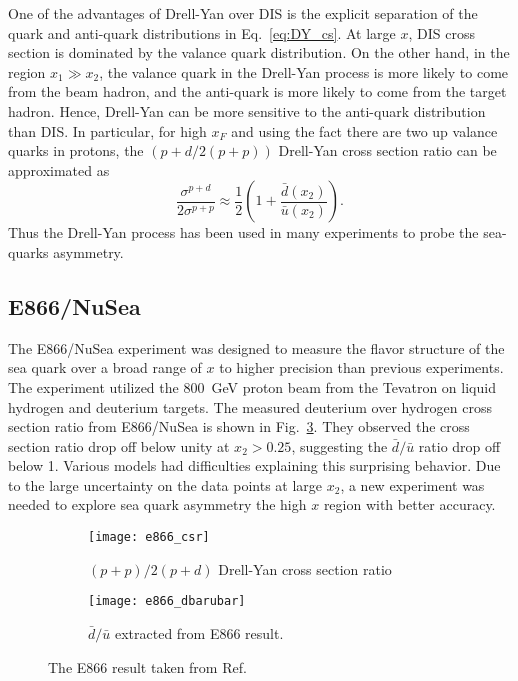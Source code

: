 One of the advantages of Drell-Yan over DIS is the explicit separation of the quark
and anti-quark distributions in Eq.\ \ref{eq:DY_cs}. At large $x$, DIS cross section 
is dominated by the valance quark distribution. On the other hand, in the region $x_1 \gg x_2$,
the valance quark in the Drell-Yan process is more likely to come from the beam 
hadron, and the anti-quark is more likely to come from the target hadron. Hence,
Drell-Yan can be more sensitive to the anti-quark distribution than DIS. In 
particular, for high $x_F$ and using the fact there are two up valance quarks in 
protons, the $(p+d/2(p+p))$ Drell-Yan cross section ratio can be approximated as 
\begin{equation}
	\frac{\sigma^{p+d}}{2\sigma^{p+p}} \approx \frac{1}{2} \left( 1+ \frac{\bar{d}\left(x_2\right)}{\bar{u}\left(x_2\right)} \right).
\end{equation}
Thus the Drell-Yan process has been used in many experiments to probe the sea-quarks 
asymmetry.


\subsection{E866/NuSea}
\label{sec:E866}
The E866/NuSea experiment was designed to measure the flavor structure of the sea 
quark over a broad range of $x$ to higher precision than previous experiments. The 
experiment utilized the \SI{800}{\GeV} proton beam from the Tevatron on liquid 
hydrogen and deuterium targets. The measured deuterium over hydrogen cross section 
ratio from E866/NuSea is shown in Fig.\ \ref{fig:e866_result}. They observed the
cross section ratio drop off below unity at $x_2>0.25$, suggesting the $\bar{d}/\bar{u}$ 
ratio drop off below 1. Various models had difficulties explaining this surprising 
behavior. Due to the large uncertainty on the data points at large $x_2$, a new 
experiment was needed to explore sea quark asymmetry the high $x$ region with better 
accuracy.
\begin{figure}[htbp!]
	\centering
	\begin{subfigure}{0.45\linewidth}
		\texttt{[image: e866\_csr]}
		\caption{$(p+p)/2(p+d)$ Drell-Yan cross section ratio}
		\label{subfig:e866_csr}
	\end{subfigure}
	\begin{subfigure}{0.45\linewidth}
		\texttt{[image: e866\_dbarubar]}
		\caption{$\bar{d}/\bar{u}$ extracted from E866 result.}
		\label{subfig:e866_dbarubar}
	\end{subfigure}
	\caption{The E866 result taken from Ref.\ \cite{fnale866/nuseacollaboration2001}}
	\label{fig:e866_result}
\end{figure}



